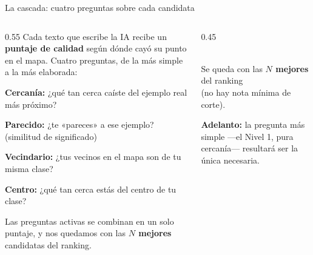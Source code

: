 \begin{frame}{La cascada: cuatro preguntas sobre cada candidata}
\begin{columns}[T]

\begin{column}{0.55\textwidth}
\small
Cada texto que escribe la IA recibe un \textbf{puntaje de calidad} según dónde cayó su punto en el mapa. Cuatro preguntas, de la más simple a la más elaborada:

\vspace{0.4em}
\begin{description}\setlength\itemsep{4pt}\small
  \item[Nivel 1 \alert{$\star$}] \textbf{Cercanía:} ¿qué tan cerca caíste del ejemplo real más próximo?
  \item[Nivel 2] \textbf{Parecido:} ¿te «pareces» a ese ejemplo? (similitud de significado)
  \item[Nivel 3] \textbf{Vecindario:} ¿tus vecinos en el mapa son de tu misma clase?
  \item[Nivel 4] \textbf{Centro:} ¿qué tan cerca estás del centro de tu clase?
\end{description}

\vspace{0.4em}
Las preguntas activas se combinan en un solo puntaje, y nos quedamos con las \textbf{$N$ mejores} candidatas del ranking.
\end{column}

\begin{column}{0.45\textwidth}
\centering
{}\\[4pt]
{\scriptsize Se queda con las \textbf{$N$ mejores} del ranking\\ (no hay nota mínima de corte).}

\vspace{0.5em}
\begin{insight}
\scriptsize \textbf{Adelanto:} la pregunta más simple —el Nivel 1, pura cercanía— resultará ser la única necesaria.
\end{insight}
\end{column}

\end{columns}
\end{frame}

